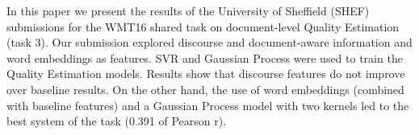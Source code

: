 In this paper we present the results of the University of Sheffield (SHEF) submissions for the WMT16 shared task on document-level Quality Estimation (task 3). Our submission explored discourse and document-aware information and word embeddings as features. SVR and Gaussian Process were used to train the Quality Estimation models. Results show that discourse features do not improve over baseline results. On the other hand, the use of word embeddings (combined with baseline features) and a Gaussian Process model with two kernels led to the best system of the task (0.391 of Pearson r).
